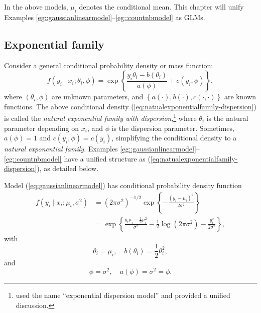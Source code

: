 In the above models, $\mu_i$ denotes the conditional mean. This chapter 
will unify Examples \ref{eg::gaussianlinearmodel}--\ref{eg::countnbmodel} as GLMs. 

\subsection{Exponential family\label{subsec:Exponential-family}}

Consider a general conditional probability density or mass function:
\begin{equation}
f(y_{i}\mid x_{i};\theta_{i},\phi)=\exp\left\{ \frac{y_{i}\theta_{i}-b(\theta_{i})}{a(\phi)}+c(y_{i},\phi)\right\} ,\label{eq:natualexponentialfamily-dispersion}
\end{equation}
where $(\theta_{i},\phi)$ are unknown parameters, and $\left\{ a(\cdot),  b(\cdot),c(\cdot,\cdot)\right\} $
are known functions. The above conditional density (\ref{eq:natualexponentialfamily-dispersion})
is called the {\it natural exponential family with dispersion},\footnote{\citet{jorgensen1987exponential} used the name ``exponential dispersion model'' and provided a unified discussion.} where $\theta_{i}$
is the natural parameter depending on $x_{i}$, and $\phi$ is the
dispersion parameter. Sometimes, $a(\phi)=1$ and $c(y_{i},\phi)=c(y_{i})$,
simplifying the conditional density to a {\it natural exponential family}. Examples \ref{eg::gaussianlinearmodel}--\ref{eg::countnbmodel}
have a unified structure as (\ref{eq:natualexponentialfamily-dispersion}), as detailed below. 

\setcounter{example}{0}
\begin{example}[continued]\label{eg::gaussianlinearmodel-continue}
 Model (\ref{eq:gaussianlinearmodel}) has conditional probability
density function
\begin{align*}
f(y_{i}  \mid x_{i};\mu_{i},\sigma^{2}) &=(2\pi\sigma^{2})^{-1/2}\exp\left\{ -\frac{(y_{i}-\mu_{i})^{2}}{2\sigma^{2}}\right\} \\
 & =\exp\left\{ \frac{y_{i}\mu_{i}-\frac{1}{2}\mu_{i}^{2}}{\sigma^{2}}-\frac{1}{2}\log(2\pi\sigma^{2})-\frac{y_{i}^{2}}{2\sigma^{2}}\right\} ,
\end{align*}
with 
\[
\theta_{i}=\mu_{i},\quad b(\theta_{i})=\frac{1}{2}\theta_{i}^{2},
\]
and
$$
\phi=\sigma^{2},\quad a(\phi)=\sigma^{2} = \phi.
$$ 
\end{example}



